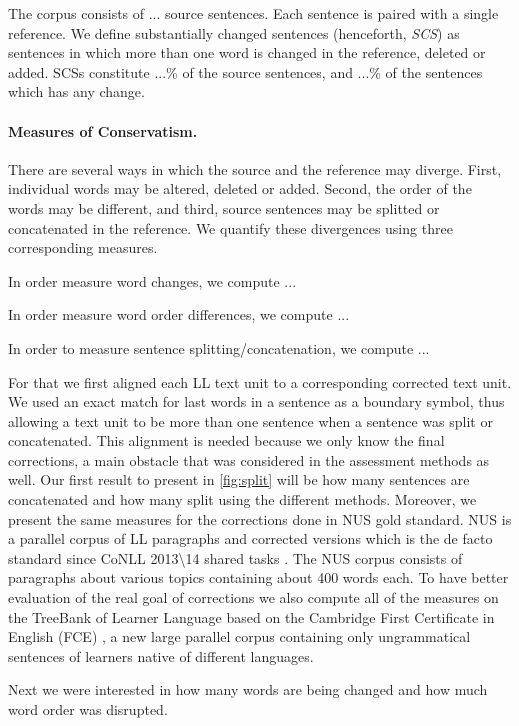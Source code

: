\documentclass[english]{article}
\begin{document}
The corpus consists of ... source sentences. Each sentence is paired with a single reference.
We define substantially changed sentences (henceforth, {\it SCS})
as sentences in which more than one word is changed in the reference, deleted or added.
SCSs constitute ...\% of the source sentences, and ...\% of the sentences
which has any change.

\paragraph{Measures of Conservatism.} There are several ways in which the source and the reference
may diverge. First, individual words may be altered, deleted or added. Second, the order of the words
may be different, and third, source sentences may be splitted or concatenated in the reference.
We quantify these divergences using three corresponding measures.

In order measure word changes, we compute ... 

In order measure word order differences, we compute ... 

In order to measure sentence splitting/concatenation, we compute ...


For that we first aligned each LL text unit
to a corresponding corrected text unit. We used an exact match for last words in a sentence as a boundary symbol, thus allowing a text unit to be more than one sentence when a sentence was split or concatenated. 
This alignment is needed because we only know the final corrections, a main obstacle that was considered
in the assessment methods as well\cite{dahlmeier2012better}.
Our first result to present in \ref{fig:split} will be how many sentences are concatenated and
how many split using the different methods. Moreover, we present the same measures for the corrections done in  NUS\cite{dahlmeier2013building} gold standard. NUS is a parallel
corpus of LL paragraphs and corrected versions which is the de
facto standard since CoNLL 2013\textbackslash{}14 shared tasks \cite{kao2013conll,ng2014conll}.
The NUS corpus consists of paragraphs about
various topics containing about 400 words each.
To have better evaluation of the real goal of corrections we also
compute all of the measures on the TreeBank of Learner Language \cite{berzak2016universal}based
on the Cambridge First Certificate in English (FCE) \cite{yannakoudakis2011new},
a new large parallel corpus containing only ungrammatical sentences of learners native of different languages.

Next we were interested in how many words are being changed and how much word order was disrupted. 
\end{document}
